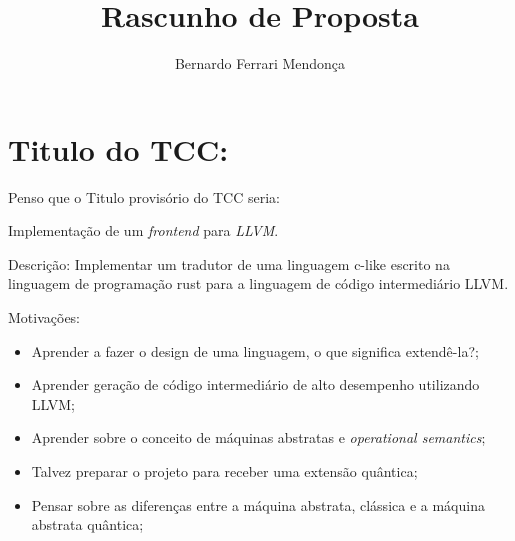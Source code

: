 \documentclass[12pt]{article}
\author{Bernardo Ferrari Mendonça}
\title{Rascunho de Proposta}
\begin{document}
\section{Titulo do TCC:}

Penso que o Titulo provisório do TCC seria:

\begin{center}
Implementação de um \textit{frontend} para \textit{LLVM}.
\end{center}

Descrição: Implementar um tradutor de uma linguagem c-like escrito na linguagem de programação rust para a linguagem de código intermediário LLVM\@.

Motivações:
\begin{itemize}
  \item Aprender a fazer o design de uma linguagem, o que significa extendê-la?;
  \item Aprender geração de código intermediário de alto desempenho utilizando LLVM\@;
  \item Aprender sobre o conceito de máquinas abstratas e \textit{operational semantics};
  \item Talvez preparar o projeto para receber uma extensão quântica;
  \item Pensar sobre as diferenças entre a máquina abstrata, clássica e a máquina abstrata quântica;
\end{itemize}
\end{document}
